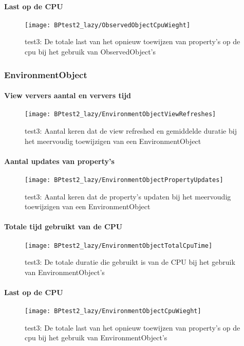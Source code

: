 \paragraph{Last op de CPU}
\begin{figure}[H]
    \centering
    \texttt{[image: BPtest2\_lazy/ObservedObjectCpuWieght]} 
    \caption{test3: De totale last van het opnieuw toewijzen van property's op de cpu bij het gebruik van ObservedObject's}
    \label{fig:cpuWeightObservedObject2}
\end{figure}

\subsubsection{EnvironmentObject}
\paragraph{View ververs aantal en ververs tijd}
\begin{figure}[H]
    \centering
    \texttt{[image: BPtest2\_lazy/EnvironmentObjectViewRefreshes]} 
    \caption{test3: Aantal keren dat de view refreshed en gemiddelde duratie bij het meervoudig toewijzigen van een EnvironmentObject}
    \label{fig:viewRefreshesEnvironmentObject2}
\end{figure}
\paragraph{Aantal updates van property's}
\begin{figure}[H]
    \centering
    \texttt{[image: BPtest2\_lazy/EnvironmentObjectPropertyUpdates]} 
    \caption{test3: Aantal keren dat de property's updaten bij het meervoudig toewijzigen van een EnvironmentObject}
    \label{fig:propertyUpdatesEnvironmentObject2}
\end{figure}
\paragraph{Totale tijd gebruikt van de CPU}
\begin{figure}[H]
    \centering
    \texttt{[image: BPtest2\_lazy/EnvironmentObjectTotalCpuTime]} 
    \caption{test3: De totale duratie die gebruikt is van de CPU bij het gebruik van EnvironmentObject's}
    \label{fig:cpuUsageTimeEnvironmentObject2}
\end{figure}
\paragraph{Last op de CPU}
\begin{figure}[H]
    \centering
    \texttt{[image: BPtest2\_lazy/EnvironmentObjectCpuWieght]} 
    \caption{test3: De totale last van het opnieuw toewijzen van property's op de cpu bij het gebruik van EnvironmentObject's}
    \label{fig:cpuWeightEnvironmentObject2}
\end{figure}

